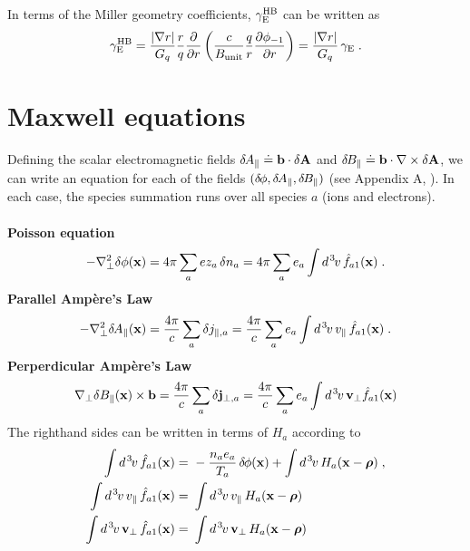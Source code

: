 \noindent
In terms of the Miller geometry coefficients, 
$\gamma_{\rm E}^{\rm HB}$ can be written as 
%
\begin{equation}
\gamma_{\rm E}^{\rm HB} = 
  \frac{|\nabla r|}{G_q} \frac{r}{q} \frac{\partial}{\partial r} 
  \left( \frac{c}{B_{\rm unit}} \frac{q}{r} \frac{\partial \phi_{-1}}{\partial r} 
  \right) = 
   \frac{|\nabla r|}{G_q} \, \gamma_{\rm E} \; .
\end{equation}

\section{Maxwell equations}

Defining the scalar electromagnetic fields $\delta \hskip -1pt A_\parallel \doteq \mathbf{b} \cdot \delta {\bf A}$ 
and $\delta \hskip -1pt B_\parallel \doteq \mathbf{b} \cdot \nabla \times \delta {\bf A}$, we can write an 
equation for each of the fields $(\delta \hskip -1pt \phi,\delta \hskip -1pt A_\parallel,\delta \hskip -1pt B_\parallel)$ (see Appendix A, 
\cite{sugama:1998}).  In each case, the species summation runs over all 
species $a$ (ions and electrons).\\
\\
%
{\bf Poisson equation}
%
\begin{equation}
-\nabla_\perp^2 \delta\phi({\bf x}) = 4\pi \sum_a e z_a \, \delta n_a 
  = 4\pi \sum_a e_a \int d^{\hskip 1pt 3} \hskip -1pt v \, {\hat f}_{a1}({\bf x}) \; .
\end{equation}
%
{\bf Parallel Amp\`ere's Law}
%
\begin{equation}
-\nabla_\perp^2 \delta \hskip -1pt A_\parallel({\bf x}) = \frac{4\pi}{c} \sum_a \delta j_{\parallel,a} = 
\frac{4\pi}{c} \sum_a e_a \int d^{\hskip 1pt 3} \hskip -1pt v \, v_\parallel \, {\hat f}_{a1}({\bf x}) \; .
\end{equation}
%
{\bf Perperdicular Amp\`ere's Law}
%
\begin{equation}
\nabla_\perp \delta B_\parallel({\bf x}) \times \mathbf{b} 
= \frac{4 \pi}{c} \sum_a \delta {\bf j}_{\perp,a}
= \frac{4 \pi}{c} \sum_a 
e_a \int d^{\hskip 1pt 3} \hskip -1pt v \, \mathbf{v}_\perp {\hat f}_{a1}({\bf x}) 
\end{equation}
%
The righthand sides can be written in terms of $H_a$ according to
%
\begin{align}
\int d^{\hskip 1pt 3} \hskip -1pt v \, {\hat f}_{a1}({\bf x}) = &~ -\frac{n_a e_a}{T_a} \, \delta \hskip -1pt \phi({\bf x}) + 
\int d^{\hskip 1pt 3} \hskip -1pt v \, H_a({\bf x}-\boldsymbol{\rho}) \; , \\
\int d^{\hskip 1pt 3} \hskip -1pt v \, v_\parallel \, {\hat f}_{a1}({\bf x}) = &~ \int d^{\hskip 1pt 3} \hskip -1pt v \, v_\parallel \, H_a({\bf x}-\boldsymbol{\rho}) \\
\int d^{\hskip 1pt 3} \hskip -1pt v \, \mathbf{v}_\perp \, {\hat f}_{a1}({\bf x}) = &~ \int d^{\hskip 1pt 3} \hskip -1pt v \, 
 \mathbf{v}_\perp \, H_a({\bf x}-\boldsymbol{\rho})
\end{align}

